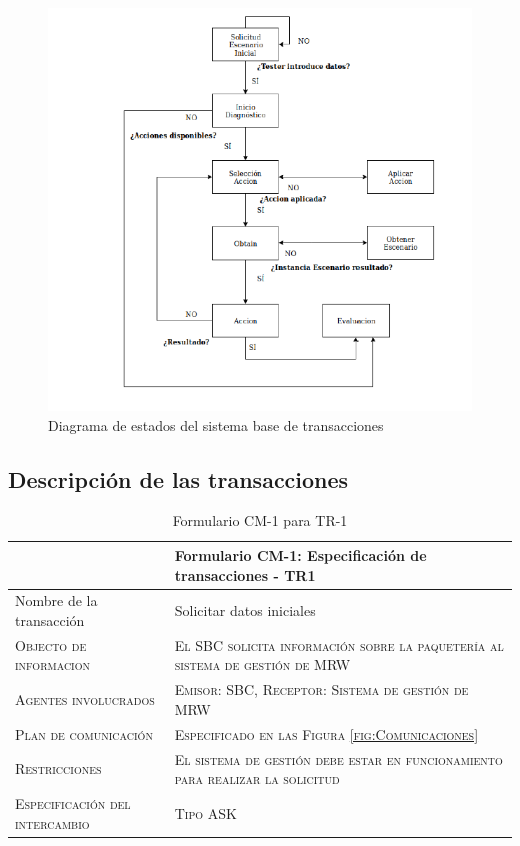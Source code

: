   \begin{figure}[H]
    \centering
    \includegraphics[scale=0.50]{imaxes/ControlTransacciones.png}
    \caption{\label{fig:ControlTransacciones}Diagrama de estados del sistema base de transacciones}
  \end{figure}
  
\subsection{Descripción de las transacciones}

\begin{table}[H]
  \scriptsize
  \begin{tabularx}{\textwidth}{|l|X|} \hline
    & \textbf{Formulario CM-1: Especificación de transacciones - TR1} \\
    \hline\hline
    {Nombre de la transacción} & Solicitar datos iniciales\\
    \hline  
    \textsc{Objecto de informacion} & \textsc{El SBC solicita información sobre la paquetería al sistema de gestión de MRW}\\ 
    \hline
    \textsc{Agentes involucrados} & \textsc{Emisor: SBC, Receptor: Sistema de gestión de MRW}\\ 
    \hline
    \textsc{Plan de comunicación} & \textsc{Especificado en las Figura \ref{fig:Comunicaciones} }\\ 
    \hline
    \textsc{Restricciones} & \textsc{El sistema de gestión debe estar en funcionamiento para realizar la solicitud}\\ 
    \hline
    \textsc{Especificación del intercambio} & \textsc{Tipo ASK}\\ 
    \hline
  \end{tabularx}
  \caption{\label{tab:TR1}Formulario CM-1 para TR-1}
\end{table}
  

